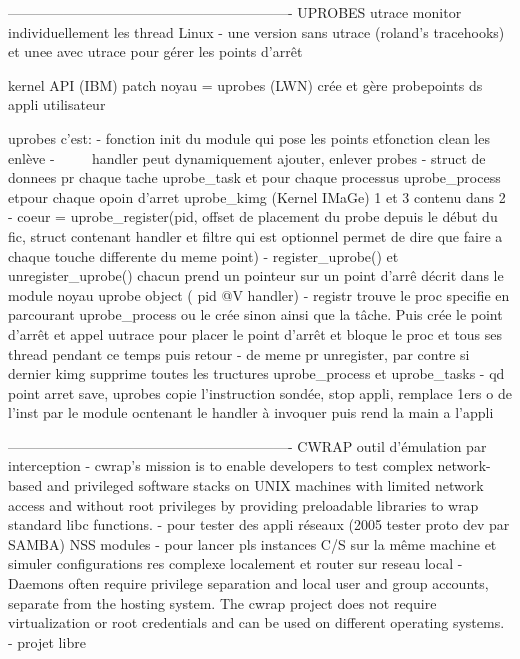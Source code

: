-------------------------------------------------------------
UPROBES
utrace monitor individuellement les thread Linux
- une version sans utrace (roland's tracehooks) et unee avec utrace pour gérer les points d'arrêt 

kernel API (IBM) patch noyau = uprobes (LWN)
crée et gère probepoints ds appli utilisateur

uprobes c'est:
- fonction init du module qui pose les points etfonction clean les enlève
- ~~~~ handler peut dynamiquement ajouter, enlever probes
- struct de donnees pr chaque tache uprobe_task et pour chaque processus uprobe_process etpour chaque opoin d'arret uprobe_kimg (Kernel IMaGe) 1 et 3 contenu dans 2
- coeur = uprobe_register(pid, offset de placement du probe depuis le début du fic, struct contenant handler et filtre qui est optionnel permet de dire que faire a chaque touche differente du meme point)
- register_uprobe() et unregister_uprobe() chacun prend un pointeur sur un point d'arrê décrit dans le module noyau uprobe object ( pid @V handler)
- registr trouve le proc specifie en parcourant uprobe_process ou le crée sinon ainsi que la tâche. Puis crée le point d'arrêt et appel uutrace pour placer le point d'arrêt  et bloque le proc et tous ses thread pendant ce temps puis retour
- de meme pr unregister, par contre si dernier kimg supprime toutes les tructures uprobe_process et uprobe_tasks
- qd point arret save, uprobes copie l'instruction sondée, stop appli, remplace 1ers o de l'inst par le module ocntenant le handler à invoquer puis rend la main a l'appli



-------------------------------------------------------------
CWRAP outil d'émulation par interception
- cwrap's mission is to enable developers to test complex network-based and privileged software stacks on UNIX machines with limited network access and without root privileges by providing preloadable libraries to wrap standard libc functions.
- pour tester des appli réseaux (2005 tester proto dev par SAMBA) NSS modules
- pour lancer pls instances C/S sur la même machine et simuler configurations res complexe localement et router sur reseau local
- Daemons often require privilege separation and local user and group accounts, separate from the hosting system. The cwrap project does not require virtualization or root credentials and can be used on different operating systems.
- projet libre                  

